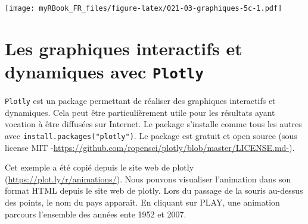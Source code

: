 \documentclass[
]{book}
\newenvironment{Shaded}{\begin{snugshade}}{\end{snugshade}}
\newcommand{\DataTypeTok}[1]{\textcolor[rgb]{0.13,0.29,0.53}{#1}}
\newcommand{\DecValTok}[1]{\textcolor[rgb]{0.00,0.00,0.81}{#1}}
\newcommand{\KeywordTok}[1]{\textcolor[rgb]{0.13,0.29,0.53}{\textbf{#1}}}
\newcommand{\NormalTok}[1]{#1}
\newcommand{\OperatorTok}[1]{\textcolor[rgb]{0.81,0.36,0.00}{\textbf{#1}}}
\newcommand{\StringTok}[1]{\textcolor[rgb]{0.31,0.60,0.02}{#1}}
\begin{document}
\begin{Shaded}
\end{Shaded}

\texttt{[image: myRBook\_FR\_files/figure-latex/021-03-graphiques-5c-1.pdf]}

\hypertarget{les-graphiques-interactifs-et-dynamiques-avec-plotly}{%
\section{\texorpdfstring{Les graphiques interactifs et dynamiques avec \texttt{Plotly}}{Les graphiques interactifs et dynamiques avec Plotly}}\label{les-graphiques-interactifs-et-dynamiques-avec-plotly}}

\texttt{Plotly} est un package permettant de réaliser des graphiques interactifs et dynamiques. Cela peut être particulièrement utile pour les résultats ayant vocation à être diffusées sur Internet. Le package s'installe comme tous les autres avec \texttt{install.packages("plotly")}. Le package est gratuit et open source (sous license MIT -\url{https://github.com/ropensci/plotly/blob/master/LICENSE.md-}).

Cet exemple a été copié depuis le site web de plotly (\url{https://plot.ly/r/animations/}). Nous pouvons visualiser l'animation dans son format HTML depuis le site web de plotly. Lors du passage de la souris au-dessus des points, le nom du pays apparaît. En cliquant sur PLAY, une animation parcours l'ensemble des années ente 1952 et 2007.
\end{document}
